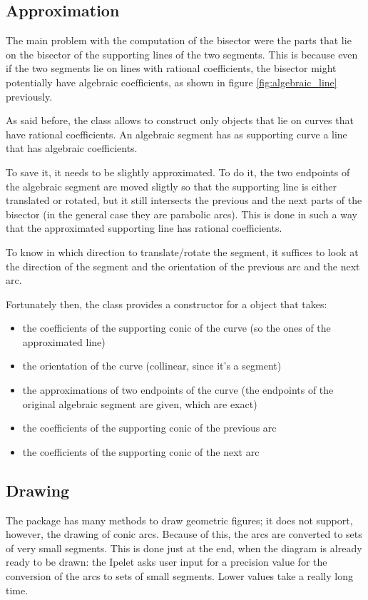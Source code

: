 \documentclass[11pt,a4paper,english]{article}
\begin{document}
	\subsection{Approximation}
	The main problem with the computation of the bisector were the parts that lie on the bisector of the supporting lines of the two segments. This is because even if the two segments lie on lines with rational coefficients, the bisector might potentially have algebraic coefficients, as shown in figure \ref{fig:algebraic_line} previously.\ppar

	As said before, the class  allows to construct only  objects that lie on curves that have rational coefficients. An algebraic segment has as supporting curve a line that has algebraic coefficients.\par
	To save it, it needs to be slightly approximated. To do it, the two endpoints of the algebraic segment are moved sligtly so that the supporting line  is either translated or rotated, but it still intersects the previous and the next parts of the bisector (in the general case they are parabolic arcs). This is done in such a way that the approximated supporting line has rational coefficients.\par
	To know in which direction to translate/rotate the segment, it suffices to look at the direction of the segment and the orientation of the previous arc and the next arc.\par
	Fortunately then, the  class provides a constructor for a  object that takes:
	\begin{itemize}[label=\(\triangleright\)]\setlength{\itemsep}{-2pt}
		\item the coefficients of the supporting conic of the curve (so the ones of the approximated line)
	\item the orientation of the curve (collinear, since it's a segment)
	\item the approximations of two endpoints of the curve (the endpoints of the original algebraic segment are given, which are exact)
	\item the coefficients of the supporting conic of the previous arc
	\item the coefficients of the supporting conic of the next arc
	\end{itemize}
	
	\subsection{Drawing}
	The  package has many methods to draw geometric figures; it does not support, however, the drawing of conic arcs. Because of this, the arcs are converted to sets of very small segments. This is done just at the end, when the diagram is already ready to be drawn: the Ipelet asks user input for a precision value for the conversion of the arcs to sets of small segments. Lower values take a really long time.
	
\end{document}
